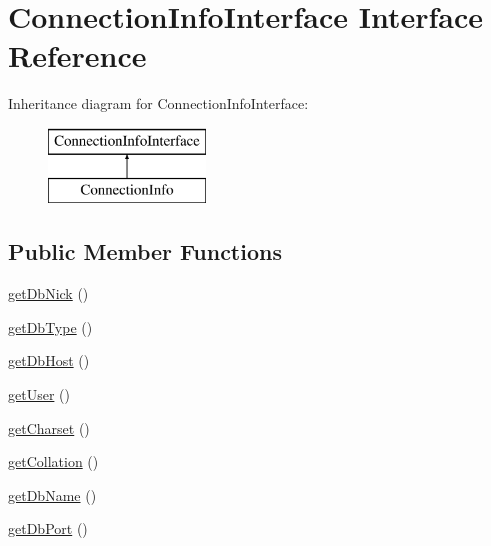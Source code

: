 \hypertarget{interface_pes_1_1_database_1_1_handler_1_1_connection_info_interface}{}\section{Connection\+Info\+Interface Interface Reference}
\label{interface_pes_1_1_database_1_1_handler_1_1_connection_info_interface}
Inheritance diagram for Connection\+Info\+Interface\+:\begin{figure}[H]
\begin{center}
\leavevmode
\includegraphics[height=2.000000cm]{interface_pes_1_1_database_1_1_handler_1_1_connection_info_interface}
\end{center}
\end{figure}
\subsection*{Public Member Functions}
\begin{DoxyCompactItemize}
\item 
\mbox{\hyperlink{interface_pes_1_1_database_1_1_handler_1_1_connection_info_interface_a05c8fadf9d084bd94acc30760baae90f}{get\+Db\+Nick}} ()
\item 
\mbox{\hyperlink{interface_pes_1_1_database_1_1_handler_1_1_connection_info_interface_a36e6adfcbef4d922b36b8c6cea954c5c}{get\+Db\+Type}} ()
\item 
\mbox{\hyperlink{interface_pes_1_1_database_1_1_handler_1_1_connection_info_interface_ad855d2dfa322f4566b89fcc00fd0e282}{get\+Db\+Host}} ()
\item 
\mbox{\hyperlink{interface_pes_1_1_database_1_1_handler_1_1_connection_info_interface_ae81b7186fb97a7c6457edcc68c9aa2ef}{get\+User}} ()
\item 
\mbox{\hyperlink{interface_pes_1_1_database_1_1_handler_1_1_connection_info_interface_abca2d528da8311b6fcfe040768cbaa24}{get\+Charset}} ()
\item 
\mbox{\hyperlink{interface_pes_1_1_database_1_1_handler_1_1_connection_info_interface_a8a2e3a5e3b3b7a164c858bcfdd49ac71}{get\+Collation}} ()
\item 
\mbox{\hyperlink{interface_pes_1_1_database_1_1_handler_1_1_connection_info_interface_a4949c3e4d80c0d275c80e0c1c3b5b280}{get\+Db\+Name}} ()
\item 
\mbox{\hyperlink{interface_pes_1_1_database_1_1_handler_1_1_connection_info_interface_add0a7153055b0ebf4d84b7a235fee1c7}{get\+Db\+Port}} ()
\end{DoxyCompactItemize}


